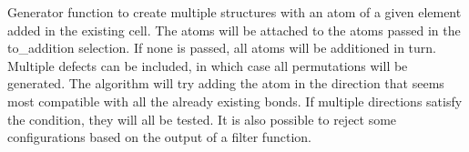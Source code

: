 \documentclass[letterpaper,10pt,english]{sphinxmanual}
\begin{document}
\begin{fulllineitems}
\label{doctree/soprano.collection.generate.defect:soprano.collection.generate.defect.additionGen}
Generator function to create multiple structures with an atom of a
given element added in the existing cell. The atoms will be attached to 
the atoms passed in the to\_addition selection. If none is passed,
all atoms will be additioned in turn. Multiple defects can be included, in
which case all permutations will be generated. The algorithm will try
adding the atom in the direction that seems most compatible with all the
already existing bonds. If multiple directions satisfy the condition, they
will all be tested.
It is also possible to reject some configurations based on the output of a
filter function.


\end{fulllineitems}
\end{document}
